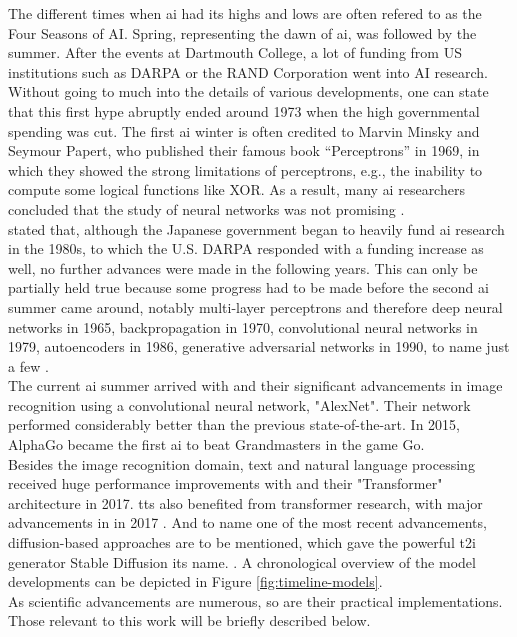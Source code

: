 \documentclass[
  a4paper,  %
  twoside,  %
  bibliography=totoc,
  headsepline,
  cleardoublepage=empty,
  parskip=half,
  draft=false
]{scrbook}
\begin{document}
The different times when \gls{ai} had its highs and lows are often refered to as the Four Seasons of AI. Spring, representing the dawn of \gls{ai}, was followed by the summer. After the events at Dartmouth College, a lot of funding from US institutions such as DARPA or the RAND Corporation went into AI research. Without going to much into the details of various developments, one can state that this first hype abruptly ended around 1973 when the high governmental spending was cut. The first \gls{ai} winter is often credited to Marvin Minsky and Seymour Papert, who published their famous book “Perceptrons” \cite{minskyPerceptronsIntroductionComputational2017} in 1969, in which they showed the strong limitations of perceptrons, e.g., the inability to compute some logical functions like XOR. As a result, many \gls{ai} researchers concluded that the study of neural networks was not promising \cite{flasinskiHistoryArtificialIntelligence2016}. \\
 stated that, although the Japanese government began to heavily fund \gls{ai} research in the 1980s, to which the U.S. DARPA responded with a funding increase as well, no further advances were made in the following years. This can only be partially held true because some progress had to be made before the second \gls{ai} summer came around, notably multi-layer perceptrons and therefore deep neural networks in 1965, backpropagation in 1970, convolutional neural networks in 1979, autoencoders in 1986, generative adversarial networks in 1990, to name just a few \cite{schmidhuberAnnotatedHistoryModern2022}. \\

The current \gls{ai} summer arrived with \citet{krizhevskyImageNetClassificationDeep2012} and their significant advancements in image recognition using a convolutional neural network, "AlexNet". Their network performed considerably better than the previous state-of-the-art. In 2015, AlphaGo became the first \gls{ai} to beat Grandmasters in the game Go. \\
Besides the image recognition domain, text and natural language processing received huge performance improvements with  and their "Transformer" architecture in 2017. \gls{tts} also benefited from transformer research, with major advancements in  in 2017 \cite{wangTacotronEndtoEndSpeech2017}. And to name one of the most recent advancements, diffusion-based approaches are to be mentioned, which gave the powerful \gls{t2i} generator Stable Diffusion its name. \cite{rombachHighResolutionImageSynthesis2022}. A chronological overview of the model developments can be depicted in Figure \ref{fig:timeline-models}. \\
As scientific advancements are numerous, so are their practical implementations. Those relevant to this work will be briefly described below.
\end{document}

